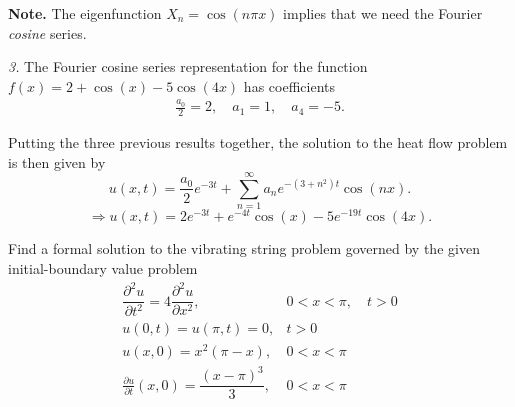 \documentclass[11pt]{article}
\begin{document}
\begin{solution}
\textbf{Note.} The eigenfunction $X_{n}=\cos(n\pi x)$ implies that we need the Fourier \textsl{cosine} series.

\textsl{3. } The Fourier cosine series representation for the function $f(x)=2+\cos(x)-5\cos(4x)$ has coefficients
\begin{eqnarray*}
\boxed{\frac{a_{0}}{2} = 2, \quad a_{1} = 1, \quad a_{4} = -5}.
\end{eqnarray*}

Putting the three previous results together, the solution to the heat flow problem is then given by
\[u(x,t) = \frac{a_{0}}{2}e^{-3t}+\sum_{n=1}^{\infty}a_{n}e^{-(3+ n^{2})t}\cos (n x).\]
\[\Rightarrow
\boxed{u(x,t) = 2e^{-3t}+e^{-4t}\cos(x)-5e^{-19t}\cos(4x)}.
\]


\end{solution}







\begin{problem}
Find a formal solution to the vibrating string problem governed by the given initial-boundary value problem
\begin{equation*} \begin{array}{lr}
\dfrac{ \partial^2 u }{\partial t^2} =  4 \dfrac{ \partial^2 u }{\partial x^2} , & 0<x<\pi, \quad t>0 \\
 u(0,t)  =  u(\pi,t) =0,  & t>0 \\
 u(x,0)  =  x^2(\pi-x), & 0<x<\pi \\
 \frac{ \partial u }{\partial t}(x,0) =  \dfrac{(x-\pi)^3}{3}, & 0<x<\pi 
\end{array}\end{equation*}
\end{problem}
\end{document}
